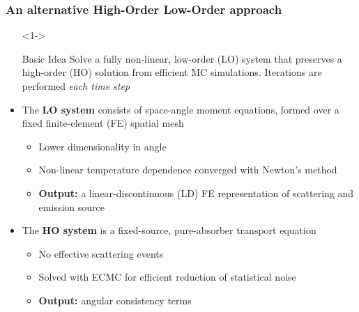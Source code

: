 \documentclass[xcolor=dvipsnames,hyperref={pdfpagelabels=false},unknownkeysallowed]{beamer}
\newcommand{\colb}[1]{{\color{blue} #1}}
\newlength{\wideitemsep}
\let\olditem\item
\renewcommand{\item}{\setlength{\itemsep}{\wideitemsep}\olditem}
\begin{document}
\begin{frame}
    \frametitle{An alternative  High-Order Low-Order approach}
    {\small
        \begin{itemize}
            \item[]<1-> \begin{block}{Basic Idea} Solve a fully non-linear, low-order (LO) system
                that preserves a high-order (HO) solution from efficient MC
            simulations. Iterations are performed \emph{each time step}\end{block}
                \vspace{-0.321in}
            \item<2-> The \textbf{LO system} consists of space-angle moment equations, formed over a fixed finite-element (FE) spatial mesh
                \begin{itemize}
                    \item<2-> \colb{Lower dimensionality} in angle
              \item<2-> Non-linear temperature dependence converged with Newton's method 
              \item<2-> \textbf{Output:} a linear-discontinuous (LD) FE representation
                        of scattering and emission source
                \end{itemize}
                \vspace{-0.1in}
            \item<3-> The \textbf{HO system} is a fixed-source, pure-absorber
                transport equation
                \begin{itemize}
                    \item<3-> \colb{No effective scattering} events
                    \item<3-> Solved with ECMC for efficient reduction of statistical noise 
                    \item<3-> \textbf{Output:} angular consistency terms
                \end{itemize}
        \end{itemize}
    }
\end{frame}
\end{document}
